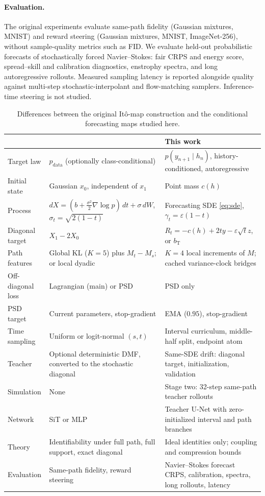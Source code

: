 \paragraph{Evaluation.} The original experiments evaluate same-path fidelity (Gaussian mixtures, MNIST) and reward steering (Gaussian mixtures, MNIST, ImageNet-256), without sample-quality metrics such as FID. We evaluate held-out probabilistic forecasts of stochastically forced Navier--Stokes: fair CRPS and energy score, spread--skill and calibration diagnostics, enstrophy spectra, and long autoregressive rollouts. Measured sampling latency is reported alongside quality against multi-step stochastic-interpolant and flow-matching samplers. Inference-time steering is not studied.

\begin{table}[t]
\caption{Differences between the original It\^o-map construction \citep{pan2026itomaps} and the conditional forecasting maps studied here.}
\label{tab:pan-differences}
\centering\small
\begin{tabular}{@{}p{}p{}p{}@{}}
\toprule
 & \citet{pan2026itomaps} & This work\\
\midrule
Target law & $p_{\mathrm{data}}$ (optionally class-conditional) & $p(y_{n+1}\mid h_n)$, history-conditioned, autoregressive\\
Initial state & Gaussian $x_0$, independent of $x_1$ & Point mass $c(h)$\\
Process & $dX=(b+\tfrac{\sigma^2}{2}\nabla\log p)\,dt+\sigma\,dW$, $\sigma_t=\sqrt{2(1-t)}$ & Forecasting SDE \eqref{eq:sde}, $\gamma_t=\varepsilon(1-t)$\\
Diagonal target & $X_1-2X_0$ & $R_t=-c(h)+2ty-\varepsilon\sqrt t z$, or $b_{\mathrm T}$\\
Path features & Global KL ($K{=}5$) plus $M_t-M_s$; or local dyadic & $K{=}4$ local increments of $M$; cached variance-clock bridges\\
Off-diagonal loss & Lagrangian (main) or PSD & PSD only\\
PSD target & Current parameters, stop-gradient & EMA ($0.95$), stop-gradient\\
Time sampling & Uniform or logit-normal $(s,t)$ & Interval curriculum, middle-half split, endpoint atom\\
Teacher & Optional deterministic DMF, converted to the stochastic diagonal & Same-SDE drift: diagonal target, initialization, validation\\
Simulation & None & Stage two: 32-step same-path teacher rollouts\\
Network & SiT or MLP & Teacher U-Net with zero-initialized interval and path branches\\
Theory & Identifiability under full path, full support, exact diagonal & Ideal identities only; coupling and compression bounds\\
Evaluation & Same-path fidelity, reward steering & Navier--Stokes forecast CRPS, calibration, spectra, long rollouts, latency\\
\bottomrule
\end{tabular}
\end{table}
